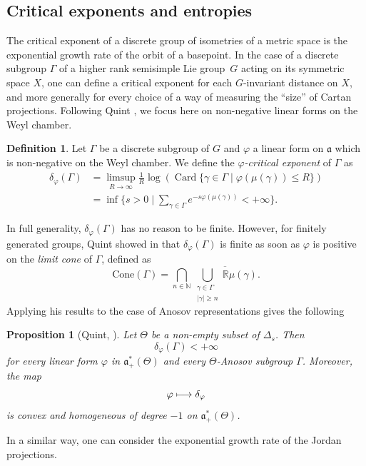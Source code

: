 \documentclass[11pt]{article}
\numberwithin{equation}{section}
\newcommand\mto{\mathchoice{\longmapsto}{\mapsto}{\mapsto}{\mapsto}}
\newtheorem{prop}[theo]{Proposition}
\theoremstyle{definition}
\newtheorem{defi}[theo]{Definition}
\newcommand{\R}{\mathbb{R}}
\newcommand{\N}{\mathbb{N}}
\newcommand{\Cone}{\mathrm{Cone}}
\newcommand{\fa}{\mathfrak{a}}
\DeclareMathOperator{\Card}{Card}
\let\phi\varphi
\let\G\Gamma
\let\g\gamma
\begin{document}
\subsection{Critical exponents and entropies} \label{subsec - Critical exponents symmetric space}

The critical exponent of a discrete group of isometries of a metric space is the exponential growth rate of the orbit of a basepoint. In the case of a discrete subgroup $\G$ of a higher rank semisimple Lie group~$G$ acting on its symmetric space $X$, one can define a critical exponent for each $G$\nobreakdash-invariant distance on $X$, and more generally for every choice of a way of measuring the ``size'' of Cartan projections. Following Quint \cite{quint2002divergence}, we focus here on non-negative linear forms on the Weyl chamber.

\begin{defi}
Let $\G$ be a discrete subgroup of $G$ and $\varphi$ a linear form on $\fa$ which is non-negative on the Weyl chamber. We define the \emph{$\varphi$-critical exponent} of $\G$ as
\begin{align*}
\delta_\varphi(\G) &= \limsup_{R\to \infty} \frac{1}{R} \log \left(\Card \{ \g \in \G \mid \varphi(\mu(\g)) \leq R\} \right)\\
&\textstyle= \inf\bigl\{s>0\mid \sum_{\g\in \G} e^{-s\varphi(\mu(\g))} < +\infty\bigr\}.
\end{align*}
\end{defi}

In full generality, $\delta_\varphi(\G)$ has no reason to be finite. However, for finitely generated groups, Quint showed in \cite{quint2002divergence} that $\delta_\phi(\G)$ is finite as soon as $\varphi$ is positive on the \emph{limit cone} of $\G$, defined as
\[\Cone(\G) = \bigcap_{n\in \N}\overline{\bigcup_{\substack{\g \in \G\\ \vert \g \vert \geq n}} \R \mu(\g)}.\]
Applying his results to the case of Anosov representations gives the following
\begin{prop}[Quint, \cite{quint2002divergence}]
Let $\Theta$ be a non-empty subset of $\Delta_s$. Then
\[\delta_\varphi(\G) < +\infty\]
for every linear form $\varphi$ in $\fa_+^*(\Theta)$ and every $\Theta$-Anosov subgroup $\G$. Moreover, the map
\[\varphi \mto \delta_\varphi\]
is convex and homogeneous of degree $-1$ on $\fa_+^*(\Theta)$.
\end{prop}

In a similar way, one can consider the exponential growth rate of the Jordan projections.
\end{document}
